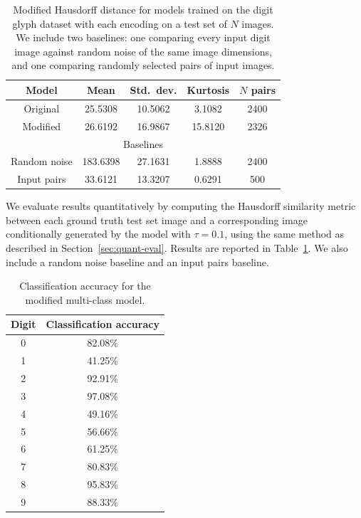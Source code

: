 \begin{table}[h]
\centering
\caption[Quantitative results for evaluating multi-class models]
    {Modified Hausdorff distance for models trained on the digit glyph dataset with each encoding on a test set of $N$ images.
    We include two baselines: one comparing every input digit image against random noise of the same image dimensions, and one comparing randomly selected pairs of input images.
    \label{tbl:class-results}}
\begin{tabular}{c c c c c}
\toprule
    Model & Mean & Std.\ dev. & Kurtosis & $N$ pairs \\ \midrule
    Original & 25.5308 & 10.5062 & 3.1082 & 2400 \\
    Modified & 26.6192 & 16.9867 & 15.8120 & 2326 \\ \midrule
    \multicolumn{5}{c}{Baselines} \\ \midrule
    Random noise & 183.6398 & 27.1631 & 1.8888 & 2400 \\
    Input pairs & 33.6121 & 13.3207 & 0.6291 & 500
\end{tabular}
\end{table}

We evaluate results quantitatively by computing the Hausdorff similarity metric between each ground truth test set image and a corresponding image conditionally generated by the model with $\tau = 0.1$, using the same method as described in Section~\ref{sec:quant-eval}.
Results are reported in Table~\ref{tbl:class-results}.
We also include a random noise baseline and an input pairs baseline.

\begin{table}[h]
\centering
\caption[Classification accuracy for the modified multi-class model]
    {Classification accuracy for the modified multi-class model.\label{tbl:class-acc}}
\begin{tabular}{c c}
\toprule
    Digit & Classification accuracy \\ \midrule
    0 & 82.08\% \\
    1 & 41.25\% \\
    2 & 92.91\% \\
    3 & 97.08\% \\
    4 & 49.16\% \\
    5 & 56.66\% \\
    6 & 61.25\% \\
    7 & 80.83\% \\
    8 & 95.83\% \\
    9 & 88.33\%
\end{tabular}
\end{table}


